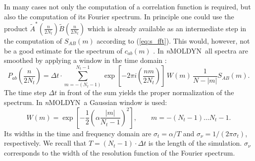 \documentclass[a4paper,11pt]{report}
\newcommand{\NMOLDYN}{\textit{n}MOLDYN}
\begin{document}
\begin{appendices}
In many cases not only the computation of a correlation function is
required, but also the computation of its Fourier spectrum. In
principle one could use the product $\tilde
A^*\left(\frac{n}{2N_t}\right) \tilde B\left(\frac{n}{2N_t}\right)$
which is already available as an intermediate step in the computation
of $S_{AB}(m)$ according to (\ref{eq:s_fft}). This would, however, not
be a good estimate for the spectrum of $c_{ab}(m)$ \cite{Papoulis:1984}. In
\NMOLDYN\ all spectra are smoothed by applying a window in the time
domain \cite{Papoulis:1984}: 
\begin{equation}
P_{ab}\left(\frac{n}{2N_t}\right) =
\Delta t\cdot \sum_{m=-(N_t-1)}^{N_t-1} 
\exp\left[-2\pi i\left(\frac{n m}{2N_t}\right)\right]
\,W(m)\,\frac{1}{N-|m|}S_{AB}(m).
\end{equation}
The time step $\Delta t$ in front of the sum yields the proper
normalization of the spectrum. In \NMOLDYN\ a Gaussian window
\cite{Harris} is used:
\begin{equation}
\label{eq:gauss_window}
W(m) = \exp\left[
-\frac{1}{2}\left(\alpha\frac{|m|}{N_t-1}\right)^2
\right],
\qquad m = -(N_t-1)\ldots N_t-1.
\end{equation}
Its widths in the time and frequency domain are $\sigma_t = \alpha/T$
and $\sigma_\nu = 1/(2\pi\sigma_t)$, respectively. We recall that $T =
(N_t-1)\cdot\Delta t$ is the length of the simulation. $\sigma_\nu$ 
corresponds to the width of the resolution function of the Fourier spectrum.
\end{appendices}
\end{document}
